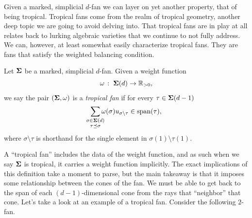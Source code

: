 \documentclass[12pt,oneside]{../../sfsuthesis}
\begin{document}
Given a marked, simplicial \( d \)-fan we can layer on yet another property, that of being tropical.
Tropical fans come from the realm of tropical geometry, another deep topic we are going to avoid delving into.
That tropical fans are in play at all relates back to lurking algebraic varieties that we continue to not fully address.
We can, however, at least somewhat easily characterize tropical fans.
They are fans that satisfy the weighted balancing condition.
\begin{definition}\th\label{def:tropical}
    Let \( {\bm{\Sigma}} \) be a marked, simplicial \( d \)-fan.
    Given a weight function
    \[
        \omega\,:\; {\bm{\Sigma}}(d) \to \mathbb{R}_{>0},
    \]
    we say the pair \( ({\bm{\Sigma}}, \omega) \) is a \emph{tropical fan} if for every \( \tau \in {\bm{\Sigma}}(d-1) \)
    \[
        \sum_{\mathclap{\substack{\sigma \in \bSigma(d) \\ \tau \preceq \sigma}}} \omega(\sigma) u_{\sigma \setminus \tau} \in \Span(\tau),
    \]
    where \( \sigma \setminus \tau \) is shorthand for the single element in \( \sigma(1) \setminus \tau(1) \).
\end{definition}
A ``tropical fan'' includes the data of the weight function, and as such when we say \( {\bm{\Sigma}} \) is tropical, it carries a weight function implicitly.
The exact implications of this definition take a moment to parse, but the main takeaway is that it imposes some relationship between the cones of the fan.
We must be able to get back to the span of each \( (d-1) \)-dimensional cone from the rays that ``neighbor'' that cone.
Let's take a look at an example of a tropical fan.
Consider the following \( 2 \)-fan.
\end{document}
